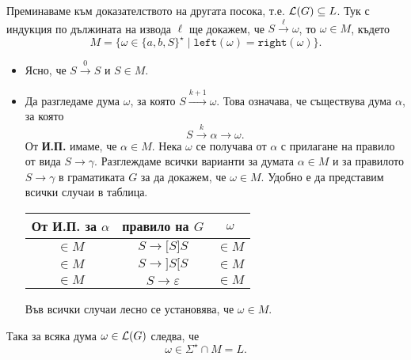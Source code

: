 \begin{hint}
  Преминаваме към доказателството на другата посока, т.е. $\mathcal{L}(G) \subseteq L$.
  Тук с индукция по дължината на извода $\ell$ ще докажем, че
  $S \stackrel{\ell}{\to} \omega$, то $\omega \in M$,
  където
  \[M = \{\omega \in \{a,b,S\}^\star \mid \texttt{left}(\omega) = \texttt{right}(\omega)\}.\]
  \begin{itemize}
  \item 
    Ясно, че $S \stackrel{0}{\rightarrow} S$ и $S \in M$.
  \item
    Да разгледаме дума $\omega$, за която $S \stackrel{k+1}{\to} \omega$.
    Това означава, че съществува дума $\alpha$, за която
    \[S \stackrel{k}{\to} \alpha \to \omega.\]
    От {\bf И.П.} имаме, че $\alpha \in M$.
    Нека $\omega$ се получава от $\alpha$ с прилагане на правило от вида $S \to \gamma$.
    Разглеждаме всички варианти за думата $\alpha \in M$ и за правилото $S \to \gamma$ в граматиката $G$
    за да докажем, че $\omega \in M$.
    Удобно е да представим всички случаи в таблица.
    \begin{center}
      \begin{tabular}{| c | c | c |}
        \hline
        От И.П. за $\alpha$ & правило на $G$ & $\omega$ \\ \hline
        $\in M$ & $S \to \texttt{[}S\texttt{]}S$ & $\in M$ \\ \hline
        $\in M$ & $S \to \texttt{]}S\texttt{[}S$ & $\in M$ \\ \hline
        $\in M$ & $S \to \varepsilon$ & $\in M$ \\ \hline
      \end{tabular}
    \end{center}    
    Във всички случаи лесно се установява, че $\omega \in M$.
  \end{itemize}
  Така за всяка дума $\omega \in \mathcal{L}(G)$ следва, че
  \[\omega \in \Sigma^\star \cap M = L.\]
\end{hint}

